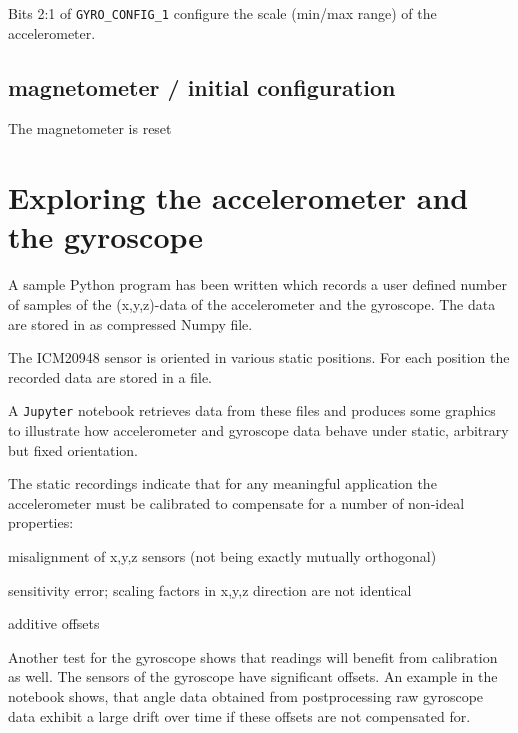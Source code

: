 \documentclass[paper=a4, oneside, fontsize=11pt,
parskip=full]{scrartcl}
\begin{document}
Bits 2:1 of \verb|GYRO_CONFIG_1| configure the scale (min/max range) of the accelerometer. 

\subsection{magnetometer / initial configuration}

The magnetometer is reset 

\section{Exploring the accelerometer and the gyroscope}

A sample Python program has been written which records a user defined number of samples of the (x,y,z)-data of the accelerometer and the gyroscope. The data are stored in as compressed Numpy file.

The ICM20948 sensor is oriented in various static positions. For each position the recorded data are stored in a file.

A \texttt{Jupyter} notebook retrieves data from these files and produces some graphics to illustrate how accelerometer and gyroscope data behave under static, arbitrary but fixed orientation.

The static recordings indicate that for any meaningful application the accelerometer must be calibrated to compensate for a number of non-ideal properties:

\begin{compactitem}
	\item misalignment of x,y,z sensors (not being exactly mutually orthogonal)
	\item sensitivity error; scaling factors in x,y,z direction are not identical
	\item additive offsets
\end{compactitem}

Another test for the gyroscope shows that readings will benefit from calibration as well. The sensors of the gyroscope have significant offsets. An example in the notebook shows, that angle data obtained from postprocessing raw gyroscope data exhibit a large drift over time if these offsets are not compensated for.




	
\end{document}
